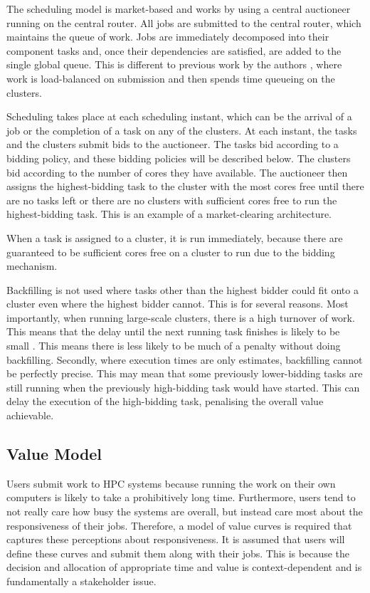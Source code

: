 \documentclass[english,british]{IEEEtran}
\begin{document}
The scheduling model is market-based and works by using a central
auctioneer running on the central router. All jobs are submitted to
the central router, which maintains the queue of work. Jobs are immediately
decomposed into their component tasks and, once their dependencies
are satisfied, are added to the single global queue. This is different
to previous work by the authors \cite{aburkimsherEngD14}, where work
is load-balanced on submission and then spends time queueing on the
clusters.

Scheduling takes place at each scheduling instant, which can be the
arrival of a job or the completion of a task on any of the clusters.
At each instant, the tasks and the clusters submit bids to the auctioneer.
The tasks bid according to a bidding policy, and these bidding policies
will be described below. The clusters bid according to the number
of cores they have available. The auctioneer then assigns the highest-bidding
task to the cluster with the most cores free until there are no tasks
left or there are no clusters with sufficient cores free to run the
highest-bidding task. This is an example of a market-clearing architecture.

When a task is assigned to a cluster, it is run immediately, because
there are guaranteed to be sufficient cores free on a cluster to run
due to the bidding mechanism.

Backfilling is not used where tasks other than the highest bidder
could fit onto a cluster even where the highest bidder cannot. This
is for several reasons. Most importantly, when running large-scale
clusters, there is a high turnover of work. This means that the delay
until the next running task finishes is likely to be small \cite{burkimsher14}.
This means there is less likely to be much of a penalty without doing
backfilling. Secondly, where execution times are only estimates, backfilling
cannot be perfectly precise. This may mean that some previously lower-bidding
tasks are still running when the previously high-bidding task would
have started. This can delay the execution of the high-bidding task,
penalising the overall value achievable.


\subsection{Value Model}

Users submit work to HPC systems because running the work on their
own computers is likely to take a prohibitively long time. Furthermore,
users tend to not really care how busy the systems are overall, but
instead care most about the responsiveness of their jobs. Therefore,
a model of value curves is required that captures these perceptions
about responsiveness. It is assumed that users will define these curves
and submit them along with their jobs. This is because the decision
and allocation of appropriate time and value is context-dependent
and is fundamentally a stakeholder issue.
\end{document}
